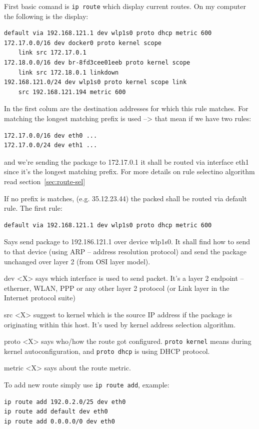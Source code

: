 \documentclass[times, utf8, seminar, english]{fer}
\begin{document}
First basic comand is \verb|ip route| which display current routes. On my computer the following is the display:
\begin{verbatim}
default via 192.168.121.1 dev wlp1s0 proto dhcp metric 600
172.17.0.0/16 dev docker0 proto kernel scope
    link src 172.17.0.1
172.18.0.0/16 dev br-8fd3cee01eeb proto kernel scope
    link src 172.18.0.1 linkdown
192.168.121.0/24 dev wlp1s0 proto kernel scope link
    src 192.168.121.194 metric 600
\end{verbatim}
In the first colum are the destination addresses for which this rule matches. For matching the longest matching prefix is used --> that mean if we have two rules:
\begin{verbatim}
172.17.0.0/16 dev eth0 ...
172.17.0.0/24 dev eth1 ...
\end{verbatim}
and we're sending the package to 172.17.0.1 it shall be routed via interface eth1 since it's the longest matching prefix. For more details on rule selectino algorithm read section~\ref{sec:route-sel}

If no prefix is matches, (e.g. 35.12.23.44) the packed shall be routed via default rule. The first rule:

\begin{verbatim}
default via 192.168.121.1 dev wlp1s0 proto dhcp metric 600
\end{verbatim}

Says send package to 192.186.121.1 over device wlp1s0. It shall find how to send to that device (using ARP -- address resolution protocol) and send the package unchanged over layer 2 (from OSI layer model).

dev <X> says which interface is used to send packet. It's a layer 2 endpoint -- etherner, WLAN, PPP or any other layer 2 protocol (or Link layer in the Internet protocol suite)

src <X> suggest to kernel which is the source IP address if the package is originating within this host. It's used by kernel address selection algorithm.

proto <X> says who/how the route got configured. \verb|proto kernel| means during kernel autoconfiguration, and \verb|proto dhcp| is using DHCP protocol.

metric <X> says about the route metric.

To add new route simply use \verb|ip route add|, example:
\begin{verbatim}
ip route add 192.0.2.0/25 dev eth0
ip route add default dev eth0
ip route add 0.0.0.0/0 dev eth0
\end{verbatim}
\end{document}

